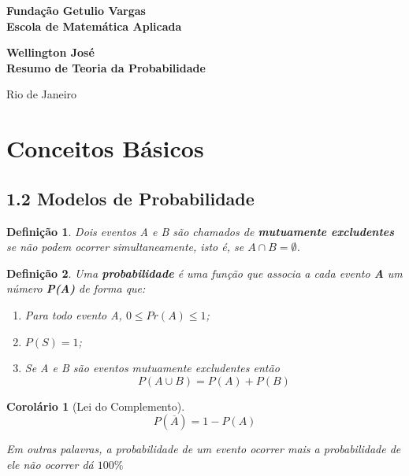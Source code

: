 \documentclass[12pt]{article}
\newtheorem{corollary}{Corolário}[theorem]
\newtheorem{definition}{Definição}
\begin{document}
\begin{titlepage}
\begin{center}
\textbf{\LARGE Fundação Getulio Vargas}\\ 
\textbf{\LARGE Escola de Matemática Aplicada}

\par
\vspace{170pt}
\textbf{\Large Wellington José}\\
\vspace{32pt}
\textbf{\Large Resumo de Teoria da Probabilidade}\\
\end{center}

\par
\vfill
\begin{center}
{{\normalsize Rio de Janeiro}\\
{\normalsize \the\year}}
\end{center}
\end{titlepage}

\section{Conceitos Básicos}
\subsection*{1.2   Modelos de Probabilidade}
\begin{definition}
Dois eventos A e B são chamados de \textbf{mutuamente excludentes} se não podem ocorrer simultaneamente, isto é, se $A \cap B = \emptyset$.
\end{definition}

\begin{definition}
Uma \textbf{probabilidade} é uma função que associa a cada evento \textbf{A} um número \textbf{P(A)} de forma que:
\begin{enumerate}
    \item Para todo evento A, $0 \leqslant Pr(A) \leqslant 1$;
    \item $P(S) = 1$;
    \item Se A e B são eventos mutuamente excludentes então
    $$P(A \cup B) = P(A) + P(B)$$
\end{enumerate}
\end{definition}

\begin{corollary}[Lei do Complemento]
$$P(\overline{A}) = 1 - P(A)$$

Em outras palavras, a probabilidade de um evento ocorrer mais a probabilidade de ele não ocorrer dá $100\%$
\end{corollary}
\end{document}
